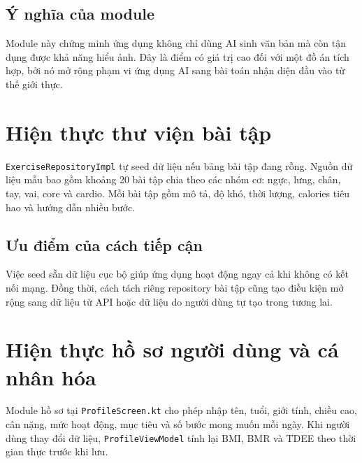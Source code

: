 \documentclass{zenbuddy-report}
\begin{document}

\subsection{Ý nghĩa của module}
Module này chứng minh ứng dụng không chỉ dùng AI sinh văn bản mà còn tận dụng được khả năng hiểu ảnh. Đây là điểm có giá trị cao đối với một đồ án tích hợp, bởi nó mở rộng phạm vi ứng dụng AI sang bài toán nhận diện đầu vào từ thế giới thực.

\section{Hiện thực thư viện bài tập}
\texttt{ExerciseRepositoryImpl} tự seed dữ liệu nếu bảng bài tập đang rỗng. Nguồn dữ liệu mẫu bao gồm khoảng 20 bài tập chia theo các nhóm cơ: ngực, lưng, chân, tay, vai, core và cardio. Mỗi bài tập gồm mô tả, độ khó, thời lượng, calories tiêu hao và hướng dẫn nhiều bước.


\subsection{Ưu điểm của cách tiếp cận}
Việc seed sẵn dữ liệu cục bộ giúp ứng dụng hoạt động ngay cả khi không có kết nối mạng. Đồng thời, cách tách riêng repository bài tập cũng tạo điều kiện mở rộng sang dữ liệu từ API hoặc dữ liệu do người dùng tự tạo trong tương lai.

\section{Hiện thực hồ sơ người dùng và cá nhân hóa}
Module hồ sơ tại \texttt{ProfileScreen.kt} cho phép nhập tên, tuổi, giới tính, chiều cao, cân nặng, mức hoạt động, mục tiêu và số bước mong muốn mỗi ngày. Khi người dùng thay đổi dữ liệu, \texttt{ProfileViewModel} tính lại BMI, BMR và TDEE theo thời gian thực trước khi lưu.

\end{document}
